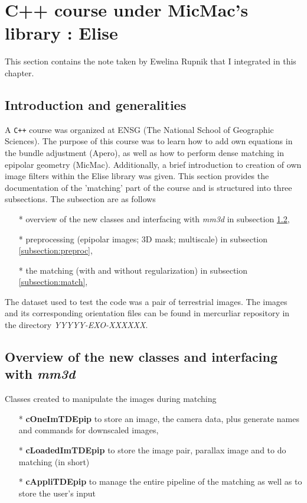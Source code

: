 
\section{C++ course under MicMac's library : Elise}

This section contains the note taken by Ewelina Rupnik that I integrated in this chapter.

\subsection{Introduction and generalities}
A \verb!C++! course was organized at ENSG (The National School of Geographic Sciences). The purpose of this course was to learn how to add own equations in the bundle adjustment (Apero), as well as how to perform dense matching in epipolar geometry (MicMac). Additionally, a brief introduction to creation of own image filters within the Elise library was given.\newline 
This section provides the documentation of the 'matching' part of the course and is structured into three subsections. The subsection are as follows
\begin{itemize}
  \item[*] overview of the new classes and interfacing with \emph{mm3d} in subsection \ref{subsection:class}, 
  \item[*] preprocessing (epipolar images; 3D mask; multiscale) in subsection \ref{subsection:preproc},
  \item[*] the matching (with and without regularization) in subsection \ref{subsection:match},
\end{itemize}

The dataset used to test the code was a pair of terrestrial images. The images and its corresponding orientation files can be found in mercurliar repository in the directory \emph{YYYYY-EXO-XXXXXX}.

\subsection{Overview of the new classes and interfacing with \emph{mm3d} }\label{subsection:class}
Classes created to manipulate the images during matching
\begin{itemize}
  \item[*] \textbf{cOneImTDEpip} to store an image, the camera data, plus generate names and commands for downscaled images,
  \item[*] \textbf{cLoadedImTDEpip} to store the image pair, parallax image and to do matching (in short)
  \item[*] \textbf{cAppliTDEpip} to manage the entire pipeline of the matching as well as to store the user's input\newline
\end{itemize}

